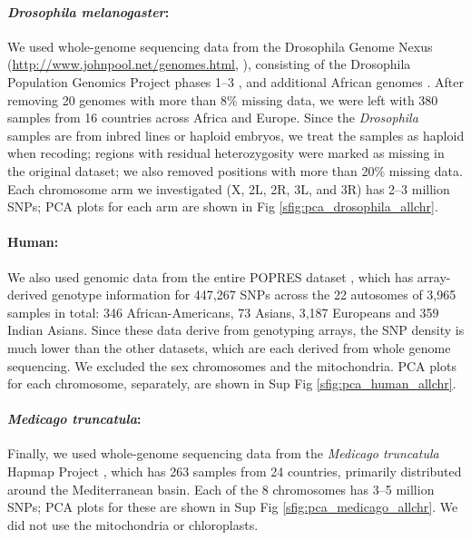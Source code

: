 \documentclass[11pt, oneside]{article}   	%
\newcommand\citep{\cite}
\newcommand{\Figure}{Fig }
\newcommand{\SFigure}{Sup Fig }
\newcommand{\Figure}{{Figure }}
\newcommand{\SFigure}{{Supplementary Figure }}
\begin{document}
\paragraph{\textit{Drosophila melanogaster}:}
We used whole-genome sequencing data 
from the Drosophila Genome Nexus (\url{http://www.johnpool.net/genomes.html}, \citep{lack2015drosophila}),
consisting of the Drosophila Population Genomics Project phases 1--3 \citep{langley2012genomic,pool2012population},
and additional African genomes \citep{lack2015drosophila}.
After removing 20 genomes with more than 8\% missing data,
we were left with 380 samples from 16 countries across Africa and Europe.
Since the \textit{Drosophila} samples are from inbred lines or haploid embryos, 
we treat the samples as haploid when recoding;
regions with residual heterozygosity were marked as missing in the original dataset;
we also removed positions with more than 20\% missing data. 
Each chromosome arm we investigated (X, 2L, 2R, 3L, and 3R) has 2--3 million SNPs;
PCA plots for each arm are shown in \Figure \ref{sfig:pca_drosophila_allchr}.

\paragraph{Human:}
We also used genomic data from the entire POPRES dataset \citep{nelson2008population},
which has array-derived genotype information for 447,267 SNPs across the 22 autosomes
of 3,965 samples in total: 346 African-Americans, 73 Asians, 3,187 Europeans and 359 Indian Asians.
Since these data derive from genotyping arrays, the SNP density is much lower than the other datasets,
which are each derived from whole genome sequencing.
We excluded the sex chromosomes and the mitochondria.
PCA plots for each chromosome, separately, are shown in \SFigure \ref{sfig:pca_human_allchr}.


\paragraph{\textit{Medicago truncatula}:}
Finally, we used whole-genome sequencing data from the \textit{Medicago truncatula} Hapmap Project \citep{tang2014improved},
which has 263 samples from 24 countries,
primarily distributed around the Mediterranean basin.
Each of the 8 chromosomes has 3--5 million SNPs;
PCA plots for these are shown in \SFigure \ref{sfig:pca_medicago_allchr}.
We did not use the mitochondria or chloroplasts.
\end{document}

